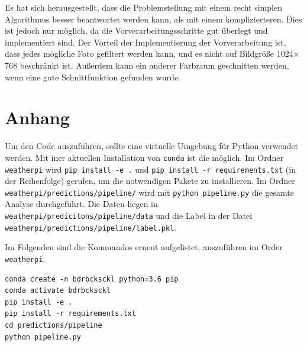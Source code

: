 Es hat sich herausgestellt, dass die Problemstellung mit einem recht
simplen Algorithmus besser beantwortet werden kann, als mit einem
komplizierteren. Dies ist jedoch nur möglich, da die
Vorverarbeitungsschritte gut überlegt und implementiert sind. Der
Vorteil der Implementierung der Vorverarbeitung ist, dass jedes mögliche
Foto gefiltert werden kann, und es nicht auf Bildgröße 1024$\times$768
beschränkt ist. Außerdem kann ein anderer Farbraum geschnitten werden,
wenn eine gute Schnittfunktion gefunden wurde.

\newpage

\hypertarget{anhang}{%
\section*{Anhang}\label{anhang}}

Um den Code auszuführen, sollte eine virtuelle Umgebung für Python
verwendet werden. Mit iner aktuellen Installation von \texttt{conda} ist
die möglich. Im Ordner \texttt{weatherpi} wird
\texttt{pip\ install\ -e\ .} und
\texttt{pip\ install\ -r\ requirements.txt} (in der Reihenfolge)
gerufen, um die notwendigen Pakete zu installieren. Im Ordner
\texttt{weatherpi/predictions/pipeline/} wird mit
\texttt{python\ pipeline.py} die gesamte Analyse durchgeführt. Die Daten
liegen in \texttt{weatherpi/predicitons/pipeline/data} und die Label in
der Datei \linebreak\texttt{weatherpi/predictions/pipeline/label.pkl}.

Im Folgenden sind die Kommandos erneut aufgelistet, auszuführen im Order
\texttt{weatherpi}.

\begin{verbatim}
conda create -n bdrbcksckl python=3.6 pip
conda activate bdrbcksckl
pip install -e .
pip install -r requirements.txt
cd predictions/pipeline
python pipeline.py
\end{verbatim}

